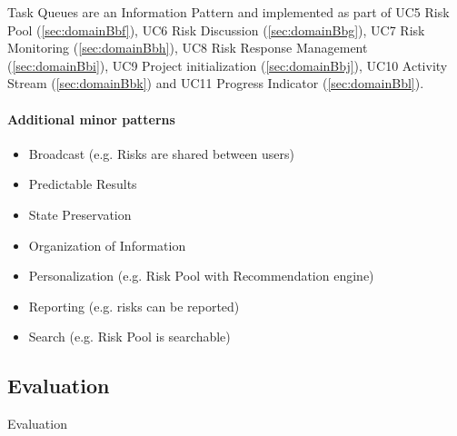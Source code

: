 Task Queues are an Information Pattern and implemented as part of \ac{UC}5 Risk Pool (\ref{sec:domainBbf}), \ac{UC}6 Risk Discussion (\ref{sec:domainBbg}), \ac{UC}7 Risk Monitoring (\ref{sec:domainBbh}), \ac{UC}8 Risk Response Management (\ref{sec:domainBbi}), \ac{UC}9 Project initialization (\ref{sec:domainBbj}), \ac{UC}10 Activity Stream (\ref{sec:domainBbk}) and \ac{UC}11 Progress Indicator (\ref{sec:domainBbl}).

\paragraph*{Additional minor patterns}

\begin{itemize}
	\item Broadcast (e.g. Risks are shared between users)
	\item Predictable Results
	\item State Preservation
	\item Organization of Information
	\item Personalization (e.g. Risk Pool with Recommendation engine)
	\item Reporting (e.g. risks can be reported)
	\item Search (e.g. Risk Pool is searchable)
\end{itemize}


\subsection{Evaluation}
\label{sec:domainCd}
Evaluation
